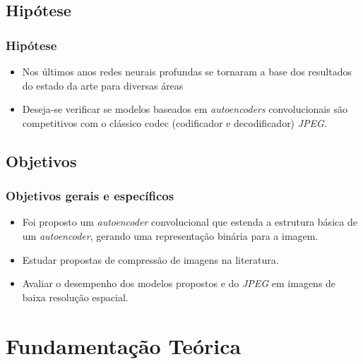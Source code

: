 \documentclass{beamer}
\begin{document}
\subsection{Hipótese}
\begin{frame}
\frametitle{Hipótese}
\begin{itemize}
\item Nos últimos anos redes neurais profundas se tornaram a base dos resultados do estado da arte para diversas áreas
\item Deseja-se verificar se modelos baseados em \textit{autoencoders} convolucionais são competitivos com o clássico codec (codificador e decodificador) \textit{JPEG}.
\end{itemize}
\end{frame}
\subsection{Objetivos}
\begin{frame}
\frametitle{Objetivos gerais e específicos}
\begin{itemize}
\item Foi proposto um \textit{autoencoder} convolucional que estenda a estrutura básica de um \textit{autoencoder}, gerando uma representação binária para a imagem.
\item Estudar propostas de compressão de imagens na literatura.
\item Avaliar o desempenho dos modelos propostos e do \textit{JPEG} em imagens de baixa resolução espacial.
\end{itemize} 
\end{frame}
\section{Fundamentação Teórica}
\end{document}
